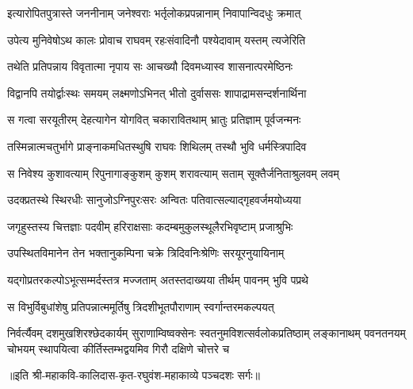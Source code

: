 \twolineshloka
{इत्यारोपितपुत्रास्ते जननीनाम् जनेश्वराः}
{भर्तृलोकप्रपन्नानाम् निवापान्विदधुः क्रमात्} %

\twolineshloka
{उपेत्य मुनिवेषोऽथ कालः प्रोवाच राघवम्}
{रहःसंवादिनौ पश्येदावाम् यस्तम् त्यजेरिति} %

\twolineshloka
{तथेति प्रतिपन्नाय विवृतात्मा नृपाय सः}
{आचख्यौ दिवमध्यास्व शासनात्परमेष्ठिनः} %

\twolineshloka
{विद्वानपि तयोर्द्वाःस्थः समयम् लक्ष्मणोऽभिनत्}
{भीतो दुर्वाससः शापाद्रामसन्दर्शनार्थिना} %

\twolineshloka
{स गत्वा सरयूतीरम् देहत्यागेन योगवित्}
{चकारावितथाम् भ्रातुः प्रतिज्ञाम् पूर्वजन्मनः} %

\twolineshloka
{तस्मिन्नात्मचतुर्भागे प्राङ्नाकमधितस्थुषि}
{राघवः शिथिलम् तस्थौ भुवि धर्मस्त्रिपादिव} %

\twolineshloka
{स निवेश्य कुशावत्याम् रिपुनागाङ्कुशम् कुशम्}
{शरावत्याम् सताम् सूक्तैर्जनिताश्रुलवम् लवम्} %

\twolineshloka
{उदक्प्रतस्थे स्थिरधीः सानुजोऽग्निपुरःसरः}
{अन्वितः पतिवात्सल्याद्गृहवर्जमयोध्यया} %

\twolineshloka
{जगृहुस्तस्य चित्तज्ञाः पदवीम् हरिराक्षसाः}
{कदम्बमुकुलस्थूलैरभिवृष्टाम् प्रजाश्रुभिः} %

\twolineshloka
{उपस्थितविमानेन तेन भक्तानुकम्पिना}
{चक्रे त्रिदिवनिःश्रेणिः सरयूरनुयायिनाम्} %

\twolineshloka
{यद्गोप्रतरकल्पोऽभूत्सम्मर्दस्तत्र मज्जताम्}
{अतस्तदाख्यया तीर्थम् पावनम् भुवि पप्रथे} %

\twolineshloka
{स विभुर्विबुधांशेषु प्रतिपन्नात्ममूर्तिषु}
{त्रिदशीभूतपौराणाम् स्वर्गान्तरमकल्पयत्} %

\fourlineindentedshloka
{निर्वर्त्यैवम् दशमुखशिरश्छेदकार्यम्}
{सुराणाम्विष्वक्सेनः स्वतनुमविशत्सर्वलोकप्रतिष्ठाम्}
{लङ्कानाथम् पवनतनयम् चोभयम् स्थापयित्वा}
{कीर्तिस्तम्भद्वयमिव गिरौ दक्षिणे चोत्तरे च} %

॥इति श्री-महाकवि-कालिदास-कृत-रघुवंश-महाकाव्ये पञ्चदशः सर्गः॥